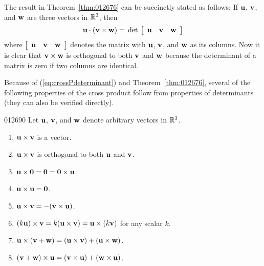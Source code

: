 The result in Theorem~\ref{thm:012676} can be succinctly stated as follows: If $\textbf{u}$, $\textbf{v}$, and $\textbf{w}$ are three vectors in $\mathbb{R}^3$, then
\begin{equation*}
\textbf{u} \cdot (\textbf{v} \times \textbf{w}) = \thinspace\operatorname{det\medspace} \left[ \begin{array}{ccc} \textbf{u} & \textbf{v} & \textbf{w}\end{array}\right]
\end{equation*}
where $\left[ \begin{array}{ccc} \textbf{u} & \textbf{v} & \textbf{w}\end{array}\right]$ denotes the matrix with $\textbf{u}$, $\textbf{v}$, and $\textbf{w}$ as its columns. Now it is clear that $\textbf{v} \times \textbf{w}$ is orthogonal to both $\textbf{v}$ and $\textbf{w}$ because the determinant of a matrix is zero if two columns are identical.


Because of (\ref{eq:crossPdeterminant}) and Theorem~\ref{thm:012676},
 several of the following properties of the cross product follow from 
properties of determinants (they can also be verified directly).

\begin{theorem}{}{012690}
Let $\textbf{u}$, $\textbf{v}$, and $\textbf{w}$ denote arbitrary vectors in $\mathbb{R}^3$.

\begin{multicols}{2}
\begin{enumerate}
\item $\textbf{u} \times \textbf{v}$ is a vector.

\item $\textbf{u} \times \textbf{v}$ is orthogonal to both $\textbf{u}$ and $\textbf{v}$.

\item $\textbf{u} \times \textbf{0} = \textbf{0} = \textbf{0} \times \textbf{u}$.

\item $\textbf{u} \times \textbf{u} = \textbf{0}$.

\item $\textbf{u} \times \textbf{v} = -(\textbf{v} \times \textbf{u})$.

\item $(k\textbf{u}) \times \textbf{v} = k(\textbf{u} \times \textbf{v}) = \textbf{u} \times (k\textbf{v})$ for any scalar $k$.

\item $\textbf{u} \times (\textbf{v} + \textbf{w}) = (\textbf{u} \times \textbf{v}) + (\textbf{u} \times \textbf{w})$.

\item $(\textbf{v} + \textbf{w}) \times \textbf{u} = (\textbf{v} \times \textbf{u}) + (\textbf{w} \times \textbf{u})$.

\end{enumerate}
\end{multicols}
\end{theorem}

